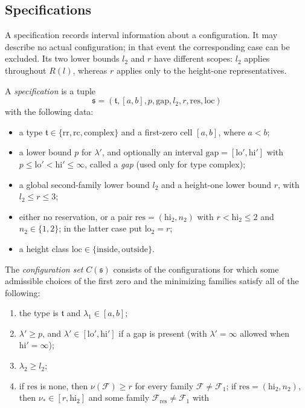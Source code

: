 \documentclass[11pt]{amsart}
\numberwithin{equation}{section}
\theoremstyle{plain}
\theoremstyle{definition}
\theoremstyle{remark}
\newcommand{\lo}{\mathrm{lo}}
\newcommand{\hi}{\mathrm{hi}}
\newcommand{\1}{\mathbf{1}}
\begin{document}
\subsection{Specifications}\label{subsec:specifications}

A specification records interval information about a configuration. It may describe
no actual configuration; in that event the corresponding case can be excluded.
Its two lower bounds $l_2$ and $r$ have different scopes: $l_2$ applies throughout
$R(l)$, whereas $r$ applies only to the height-one representatives.

\begin{definition}[Specification]\label{def:specification}
A \emph{specification} is a tuple
\[
  \mathfrak s=(\mathfrak t,[a,b],p,\mathrm{gap},l_2,r,\mathrm{res},\mathrm{loc})
\]
with the following data:
\begin{itemize}
  \item a type $\mathfrak t\in\{\mathrm{rr},\mathrm{rc},\mathrm{complex}\}$ and a
    first-zero cell $[a,b]$, where $a<b$;
  \item a lower bound $p$ for $\lambda'$, and optionally an interval
    $\mathrm{gap}=[\lo',\hi']$ with $p\le\lo'<\hi'\le\infty$, called a \emph{gap}
    (used only for type $\mathrm{complex}$);
  \item a global second-family lower bound $l_2$ and a height-one lower bound $r$,
    with $l_2\le r\le3$;
  \item either no reservation, or a pair $\mathrm{res}=(\hi_2,n_2)$ with
    $r<\hi_2\le2$ and $n_2\in\{1,2\}$; in the latter case put $\lo_2=r$;
  \item a height class $\mathrm{loc}\in\{\mathrm{inside},\mathrm{outside}\}$.
\end{itemize}
The \emph{configuration set} $C(\mathfrak s)$ consists of the configurations for which
some admissible choices of the first zero and the minimizing families satisfy all of
the following:
\begin{enumerate}[(C1)]
  \item the type is $\mathfrak t$ and $\lambda_1\in[a,b]$;
  \item $\lambda'\ge p$, and $\lambda'\in[\lo',\hi']$ if a gap is present (with $\lambda'=\infty$ allowed
    when $\hi'=\infty$);
  \item $\lambda_2\ge l_2$;
  \item if $\mathrm{res}$ is none, then $\nu(\mathcal F)\ge r$ for every family $\mathcal F\ne\mathcal F_1$; if
    $\mathrm{res}=(\hi_2,n_2)$, then $\nu_*\in[r,\hi_2]$ and some family $\mathcal F_{\mathrm{res}}\ne\mathcal F_1$ with

\end{enumerate}
\end{definition}
\end{document}
